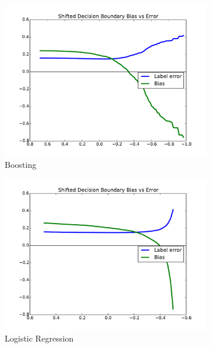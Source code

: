 \documentclass[twoside,leqno,twocolumn]{article}
\begin{document}
\begin{figure}[t]
\centering
\begin{subfigure}{.7\columnwidth}
\includegraphics[width=\columnwidth]{images/adult-boosting-T.pdf}%
\caption{Boosting}%
\label{fig:adult_boosting_tradeoff}%
\end{subfigure}%
\begin{subfigure}{.7\columnwidth}
\includegraphics[width=\columnwidth]{images/adult-lr-T.pdf}%
\caption{Logistic Regression}%
\label{fig:adult_lr_tradeoff}%
\end{subfigure}%
\begin{subfigure}{.7\columnwidth}

\end{subfigure}
\end{figure}
\end{document}
